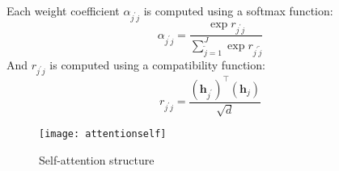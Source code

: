 Each weight coefficient $\alpha_{{j^{\prime}}j}$ is computed using a softmax function:
\[\alpha_{{j^{\prime}}j} = \frac{\exp {r_{{j^{\prime}}j}}}{\sum_{{\tilde{j}}=1}^{J} \exp  {r_{{j^{\prime}}{\tilde{j}}}}}\]
And $r_{{j^{\prime}}j}$ is computed using a compatibility function:
\[r_{{j^{\prime}}j} = \frac{(\bm{h}_{j^{\prime}})^{\top}(\bm{h}_j)}{\sqrt{d}} \]

\begin{figure}[h]
	\centering
	\texttt{[image: attentionself]}
	\caption{Self-attention structure}
\end{figure}

%


%
%



